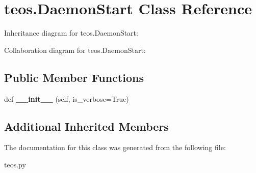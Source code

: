 \hypertarget{classteos_1_1DaemonStart}{}\section{teos.\+Daemon\+Start Class Reference}
\label{classteos_1_1DaemonStart}


Inheritance diagram for teos.\+Daemon\+Start\+:


Collaboration diagram for teos.\+Daemon\+Start\+:
\subsection*{Public Member Functions}
\begin{DoxyCompactItemize}
\item 
\mbox{\label{classteos_1_1DaemonStart_a8d75a4ac2d40dc60a4788fc7aae6d7d7}} 
def {\bfseries \+\_\+\+\_\+init\+\_\+\+\_\+} (self, is\+\_\+verbose=True)
\end{DoxyCompactItemize}
\subsection*{Additional Inherited Members}


The documentation for this class was generated from the following file\+:\begin{DoxyCompactItemize}
\item 
teos.\+py\end{DoxyCompactItemize}
